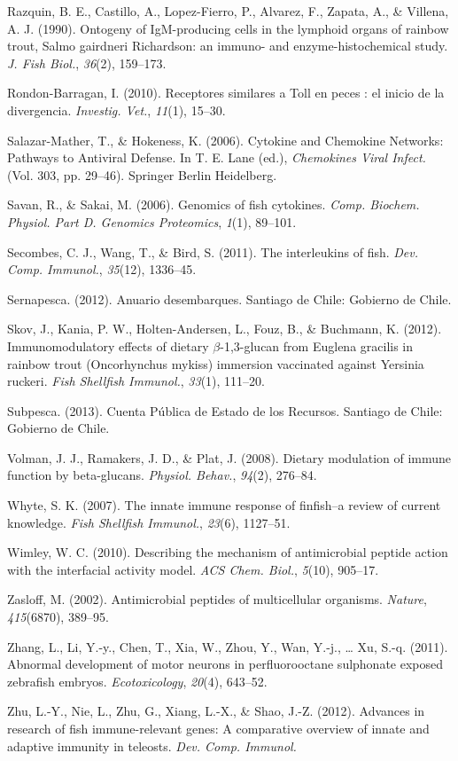 \documentclass[11pt,a4paper,]{article}
\begin{document}
Razquin, B. E., Castillo, A., Lopez-Fierro, P., Alvarez, F., Zapata, A.,
\& Villena, A. J. (1990). Ontogeny of IgM-producing cells in the
lymphoid organs of rainbow trout, Salmo gairdneri Richardson: an immuno-
and enzyme-histochemical study. \emph{J. Fish Biol.}, \emph{36}(2),
159--173.

Rondon-Barragan, I. (2010). Receptores similares a Toll en peces : el
inicio de la divergencia. \emph{Investig. Vet.}, \emph{11}(1), 15--30.

Salazar-Mather, T., \& Hokeness, K. (2006). Cytokine and Chemokine
Networks: Pathways to Antiviral Defense. In T. E. Lane (ed.),
\emph{Chemokines Viral Infect.} (Vol. 303, pp. 29--46). Springer Berlin
Heidelberg.

Savan, R., \& Sakai, M. (2006). Genomics of fish cytokines. \emph{Comp.
Biochem. Physiol. Part D. Genomics Proteomics}, \emph{1}(1), 89--101.

Secombes, C. J., Wang, T., \& Bird, S. (2011). The interleukins of fish.
\emph{Dev. Comp. Immunol.}, \emph{35}(12), 1336--45.

Sernapesca. (2012). Anuario desembarques. Santiago de Chile: Gobierno de
Chile.

Skov, J., Kania, P. W., Holten-Andersen, L., Fouz, B., \& Buchmann, K.
(2012). Immunomodulatory effects of dietary $\beta$-1,3-glucan from
Euglena gracilis in rainbow trout (Oncorhynchus mykiss) immersion
vaccinated against Yersinia ruckeri. \emph{Fish Shellfish Immunol.},
\emph{33}(1), 111--20.

Subpesca. (2013). Cuenta Pública de Estado de los Recursos. Santiago de
Chile: Gobierno de Chile.

Volman, J. J., Ramakers, J. D., \& Plat, J. (2008). Dietary modulation
of immune function by beta-glucans. \emph{Physiol. Behav.},
\emph{94}(2), 276--84.

Whyte, S. K. (2007). The innate immune response of finfish--a review of
current knowledge. \emph{Fish Shellfish Immunol.}, \emph{23}(6),
1127--51.

Wimley, W. C. (2010). Describing the mechanism of antimicrobial peptide
action with the interfacial activity model. \emph{ACS Chem. Biol.},
\emph{5}(10), 905--17.

Zasloff, M. (2002). Antimicrobial peptides of multicellular organisms.
\emph{Nature}, \emph{415}(6870), 389--95.

Zhang, L., Li, Y.-y., Chen, T., Xia, W., Zhou, Y., Wan, Y.-j., \ldots{}
Xu, S.-q. (2011). Abnormal development of motor neurons in
perfluorooctane sulphonate exposed zebrafish embryos.
\emph{Ecotoxicology}, \emph{20}(4), 643--52.

Zhu, L.-Y., Nie, L., Zhu, G., Xiang, L.-X., \& Shao, J.-Z. (2012).
Advances in research of fish immune-relevant genes: A comparative
overview of innate and adaptive immunity in teleosts. \emph{Dev. Comp.
Immunol.}
\end{document}
